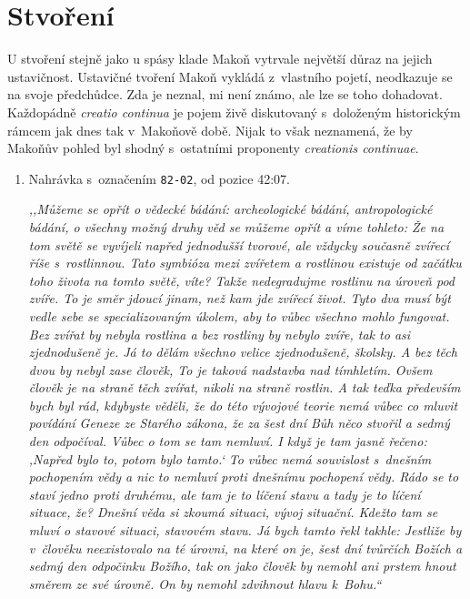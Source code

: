 \section{Stvoření}

U stvoření stejně jako u spásy klade Makoň vytrvale největší důraz na jejich
ustavičnost. Ustavičné tvoření Makoň vykládá z~vlastního pojetí, neodkazuje se
na svoje předchůdce. Zda je neznal, mi není známo, ale lze se toho dohadovat.
Každopádně \textit{creatio continua} je pojem živě diskutovaný s~doloženým
historickým rámcem jak dnes\cite{congdon2010creatio}\cite{Salim2022Creatio} tak
v~Makoňově době\cite{marcus1957typen}. Nijak to však neznamená, že by Makoňův
pohled byl shodný s~ostatními proponenty \textit{creationis continuae}.

\begin{enumerate}

\item{
Nahrávka s~označením \texttt{82-02}, od pozice 42:07.

\textit{%
,,Můžeme se opřít o vědecké bádání: archeologické bádání, antropologické bádání,
o všechny možný druhy věd se můžeme opřít a víme tohleto: Že na tom světě se
vyvíjeli napřed jednodušší tvorové, ale vždycky současně zvířecí říše
s~rostlinnou. Tato symbióza mezi zvířetem a rostlinou existuje od začátku toho
života na tomto světě, víte? Takže nedegradujme rostlinu na úroveň pod zvíře. To
je směr jdoucí jinam, než kam jde zvířecí život. Tyto dva musí být vedle sebe se
specializovaným úkolem, aby to vůbec všechno mohlo fungovat. Bez zvířat by
nebyla rostlina a bez rostliny by nebylo zvíře, tak to asi zjednodušeně je. Já
to dělám všechno velice zjednodušeně, školsky. A bez těch dvou by nebyl zase
člověk, To je taková nadstavba nad tímhletím. Ovšem člověk je na straně těch
zvířat, nikoli na straně rostlin. A tak teďka především bych byl rád, kdybyste
věděli, že do této vývojové teorie nemá vůbec co mluvit povídání Geneze ze
Starého zákona, že za šest dní Bůh něco stvořil a sedmý den odpočíval. Vůbec o
tom se tam nemluví. I když je tam jasně řečeno: ,Napřed bylo to, potom bylo
tamto.` To vůbec nemá souvislost s~dnešním pochopením vědy a nic to nemluví
proti dnešnímu pochopení vědy. Rádo se to staví jedno proti druhému, ale tam
je to líčení stavu a tady je to líčení situace, že? Dnešní věda si zkoumá
situaci, vývoj situační. Kdežto tam se mluví o stavové situaci, stavovém stavu.
Já bych tamto řekl takhle: Jestliže by v~člověku neexistovalo na té úrovni, na
které on je, šest dní tvůrčích Božích a sedmý den odpočinku Božího, tak on jako
člověk by nemohl ani prstem hnout směrem ze své úrovně. On by nemohl zdvihnout
hlavu k~Bohu.``
}

}
\end{enumerate}

